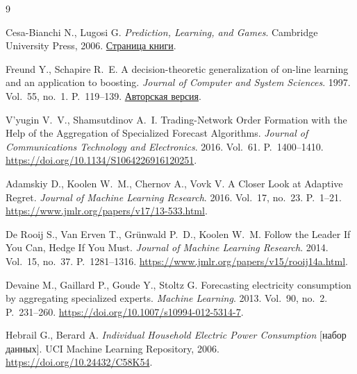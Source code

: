 \documentclass[a4paper,12pt]{article}
\theoremstyle{plain}
\theoremstyle{definition}
\theoremstyle{remark}
\numberwithin{equation}{section}
\begin{document}
\clearpage
{}
{}
\begin{thebibliography}{9}

Cesa-Bianchi N., Lugosi G.
\emph{Prediction, Learning, and Games}.
Cambridge University Press, 2006.
\href{https://cesa-bianchi.di.unimi.it/predbook/}{Страница книги}.

Freund Y., Schapire R.~E.
A decision-theoretic generalization of on-line learning and an application to boosting.
\emph{Journal of Computer and System Sciences}. 1997. Vol.~55, no.~1. P.~119--139.
\href{https://www.schapire.net/papers/FreundSc95.pdf}{Авторская версия}.

V'yugin V.~V., Shamsutdinov A.~I.
Trading-Network Order Formation with the Help of the Aggregation of Specialized Forecast Algorithms.
\emph{Journal of Communications Technology and Electronics}. 2016. Vol.~61. P.~1400--1410.
\url{https://doi.org/10.1134/S1064226916120251}.

Adamskiy D., Koolen W.~M., Chernov A., Vovk V.
A Closer Look at Adaptive Regret.
\emph{Journal of Machine Learning Research}. 2016. Vol.~17, no.~23. P.~1--21.
\url{https://www.jmlr.org/papers/v17/13-533.html}.

De Rooij S., Van Erven T., Gr\"unwald P.~D., Koolen W.~M.
Follow the Leader If You Can, Hedge If You Must.
\emph{Journal of Machine Learning Research}. 2014. Vol.~15, no.~37. P.~1281--1316.
\url{https://www.jmlr.org/papers/v15/rooij14a.html}.

Devaine M., Gaillard P., Goude Y., Stoltz G.
Forecasting electricity consumption by aggregating specialized experts.
\emph{Machine Learning}. 2013. Vol.~90, no.~2. P.~231--260.
\url{https://doi.org/10.1007/s10994-012-5314-7}.

Hebrail G., Berard A.
\emph{Individual Household Electric Power Consumption} [набор данных].
UCI Machine Learning Repository, 2006.
\url{https://doi.org/10.24432/C58K54}.

\end{thebibliography}
\end{document}
